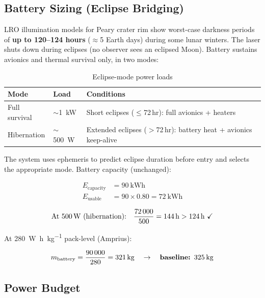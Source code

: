 \documentclass[10pt,letterpaper]{article}
\begin{document}
\subsection{Battery Sizing (Eclipse Bridging)}

LRO illumination models for Peary crater rim show worst-case darkness periods of
\textbf{up to 120--124 hours} ($\approx$5 Earth days) during some lunar winters.
The laser shuts down during eclipses (no observer sees an eclipsed Moon). Battery
sustains avionics and thermal survival only, in two modes:

\begin{table}[!ht]
\centering\small
\caption{Eclipse-mode power loads}
\label{tab:eclipse-modes}
\begin{tabularx}{\linewidth}{llX}
\toprule
\textbf{Mode} & \textbf{Load} & \textbf{Conditions} \\
\midrule
Full survival & $\sim$\SI{1}{\kilo\watt} & Short eclipses ($\leq$72\,hr): full avionics + heaters \\
Hibernation & $\sim$\SI{500}{\watt} & Extended eclipses ($>$72\,hr): battery heat + avionics keep-alive \\
\bottomrule
\end{tabularx}
\end{table}

The system uses ephemeris to predict eclipse duration before entry and selects the
appropriate mode. Battery capacity (unchanged):

\begin{align*}
  E_{\text{capacity}} &= \SI{90}{\kilo\watt\hour} \\
  E_{\text{usable}}   &= 90 \times 0.80 = \SI{72}{\kilo\watt\hour}
\end{align*}

\[
  \text{At \SI{500}{\watt} (hibernation):}\quad
  \frac{72\,000}{500} = \SI{144}{\hour} > \SI{124}{\hour}\ \checkmark
\]

At \SI{280}{\watt\hour\per\kilo\gram} pack-level (Amprius):

\[
  m_{\text{battery}} = \frac{90\,000}{280} = \SI{321}{\kilo\gram}
    \quad \rightarrow \quad \textbf{baseline: \SI{325}{\kilo\gram}}
\]

\subsection{Power Budget}
\end{document}
